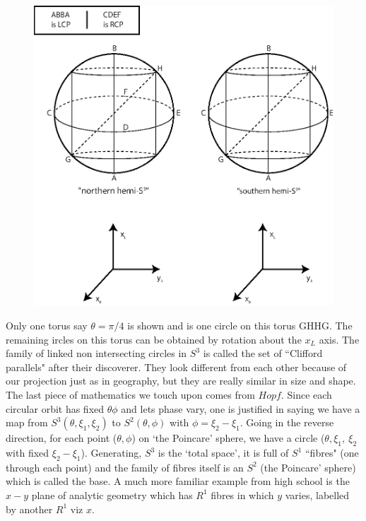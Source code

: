 \begin{figure}[H]
\centering
\includegraphics[scale=0.425]{src/images/chap26/15.jpg}
\end{figure}
\bigskip

Only one torus say $\theta  = \pi/4$ is shown and is one circle on this torus GHHG.
The remaining ircles on this torus can be obtained by rotation about the $x_L$ axis.
The family of linked non intersecting circles in $S^3$ is called the set of ``Clifford
parallels" after their discoverer. They
look different from each other because of our projection just as in geography,
but they are really similar in size and shape. The last piece of mathematics
we touch upon comes from $Hopf$. Since each circular orbit has fixed $\theta \phi$ and
lets phase vary, one is justified in saying we have a map from $S^3 (\theta, \xi_1, \xi_2)$ to
$S^2 (\theta, \phi)$ with $\phi = \xi_2 - \xi_1$. Going in the reverse direction, for each point ($\theta, \phi$) on
`the Poincare' sphere, we have a circle ($\theta, \xi_1,~ \xi_2$ with fixed $\xi_2 - \xi_1$). Generating, $S^3$ is the `total space', it is full of $S^1$ ``fibres" (one through each point) and the family of fibres itself is an $S^2$ (the Poincare' sphere) which is called the base.
A much more familiar example from high school is the $x - y$ plane of analytic
geometry which has $R^1$ fibres in which $y$ varies, labelled by another $R^1$ viz $x$.
\bigskip

